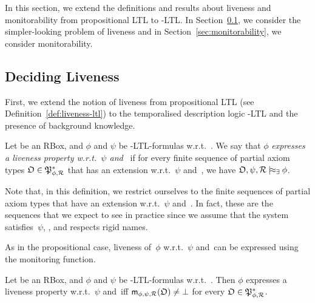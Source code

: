In this section, we extend the definitions and results about liveness and
monitorability from propositional LTL to \SHOQ-LTL\@.
%
In Section~\ref{sec:liveness}, we consider the simpler-looking problem of
liveness and in Section~\ref{sec:monitorability}, we consider monitorability.


\subsection{Deciding Liveness}\label{sec:liveness}

First, we extend the notion of liveness from propositional LTL (see
Definition~\ref{def:liveness-ltl}) to the temporalised description logic
\SHOQ-LTL and the presence of background knowledge.

\begin{definition}[Liveness]\label{def:liveness-shoq-ltl}
    Let \Rmc be an RBox, and $\phi$ and $\psi$ be \SHOQ-LTL-formulas
    w.r.t.~\Rmc.  We say that $\phi$ \emph{expresses a liveness property
    w.r.t.~$\psi$ and~\Rmc} if for every finite sequence of partial axiom types
    $\mathfrak{O}\in\mathfrak{P}_{\phi,\mathcal{R}}^*$ that has an extension w.r.t.~$\psi$ and~\Rmc, we
    have $\Omf,\psi,\Rmc\modelsex\phi$.
\end{definition}

\noindent
Note that, in this definition, we restrict ourselves to the finite sequences of
partial axiom types that have an extension w.r.t.~$\psi$ and~\Rmc.  In fact,
these are the sequences that we expect to see in practice since we assume that
the system satisfies~$\psi$, \Rmc, and respects rigid names.

As in the propositional case, liveness of~$\phi$ w.r.t.~$\psi$ and~\Rmc can be
expressed using the monitoring function.

\begin{lemma}\label{lem:liveness-char}
    Let \Rmc be an RBox, and $\phi$ and $\psi$ be \SHOQ-LTL-formulas
    w.r.t.~\Rmc.  Then $\phi$ expresses a liveness property w.r.t.~$\psi$
    and~\Rmc iff $\mathsf{m}_{\phi,\psi,\mathcal{R}}(\mathfrak{O})\ne\bot$ for every
    $\mathfrak{O}\in\mathfrak{P}_{\phi,\mathcal{R}}^*$.
\end{lemma}

